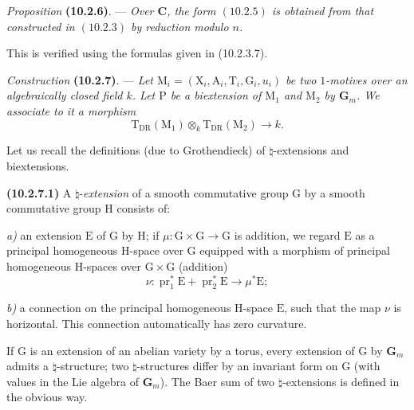 \documentclass[11pt,leqno]{article}
\begin{document}
\textit{Proposition} \textbf{(10.2.6)}. — \textit{Over
\(\mathbf{C}\), the form \((10.2.5)\) is obtained from that constructed
in \((10.2.3)\) by reduction modulo \(n\).}

This is verified using the formulas given in (10.2.3.7).

\textit{Construction} \textbf{(10.2.7)}. — \textit{Let
\(\mathrm{M}_i=(\mathrm{X}_i,\mathrm{A}_i,\mathrm{T}_i,\mathrm{G}_i,u_i)\)
be two \(1\)-motives over an algebraically closed field \(k\).
Let \(\mathrm{P}\) be a biextension of \(\mathrm{M}_1\) and
\(\mathrm{M}_2\) by \(\mathbf{G}_m\).
We associate to it a morphism}
\[
\mathrm{T}_{\mathrm{DR}}(\mathrm{M}_1)\otimes_k
\mathrm{T}_{\mathrm{DR}}(\mathrm{M}_2)\to k.
\]

Let us recall the definitions (due to Grothendieck) of
\(\natural\)-extensions and biextensions.

\textbf{(10.2.7.1)} A \(\natural\)-\textit{extension} of a smooth
commutative group \(\mathrm{G}\) by a smooth commutative group
\(\mathrm{H}\) consists of:

\noindent\textit{a)} an extension \(\mathrm{E}\) of \(\mathrm{G}\)
by \(\mathrm{H}\); if
\(\mu:\mathrm{G}\times\mathrm{G}\to\mathrm{G}\) is addition,
we regard \(\mathrm{E}\) as a principal homogeneous \(\mathrm{H}\)-space over
\(\mathrm{G}\) equipped with a morphism of principal homogeneous \(\mathrm{H}\)-spaces over
\(\mathrm{G}\times\mathrm{G}\) (addition)
\[
\nu:\operatorname{pr}_1^{*}\mathrm{E}
+\operatorname{pr}_2^{*}\mathrm{E}\to\mu^{*}\mathrm{E};
\]

\noindent\textit{b)} a connection on the principal homogeneous \(\mathrm{H}\)-space
\(\mathrm{E}\), such that the map \(\nu\) is horizontal.
This connection automatically has zero curvature.

If \(\mathrm{G}\) is an extension of an abelian variety by a
torus, every extension of \(\mathrm{G}\) by \(\mathbf{G}_m\)
admits a \(\natural\)-structure; two \(\natural\)-structures
differ by an invariant form on \(\mathrm{G}\) (with values
in the Lie algebra of \(\mathbf{G}_m\)). The Baer sum of two
\(\natural\)-extensions is defined in the obvious way.
\end{document}

